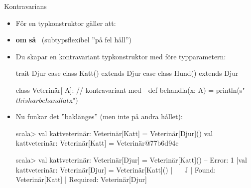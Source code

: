 \begin{Slide}{Kontravarians }
\begin{itemize}\SlideFontSmall
\item För en  typkonstruktor  gäller att: 
\item[] \textbf{om}  \textbf{så} ~(subtypsflexibel ''på fel håll'')
\item Du skapar en kontravariant typkonstruktor med \code{-} före typparametern:
\begin{Code}
trait Djur 
case class Katt() extends Djur
case class Hund() extends Djur

class Veterinär[-A]:    // kontravariant med -
  def behandla(x: A) = println(s"$this har behandlat $x")  
\end{Code}
\pause
\item Nu funkar det ''baklänges'' (men inte på andra hållet):
\begin{REPLsmall}
scala> val kattveterinär: Veterinär[Katt] = Veterinär[Djur]()
val kattveterinär: Veterinär[Katt] = Veterinär@77b6d94c

scala> val kattveterinär: Veterinär[Djur] = Veterinär[Katt]()
-- Error:
1 |val kattveterinär: Veterinär[Djur] = Veterinär[Katt]()
  |                                     ^^^^^^^^^^^^^^^^^
  |                                     Found:    Veterinär[Katt]
  |                                     Required: Veterinär[Djur]
\end{REPLsmall}
\end{itemize}

\end{Slide}


